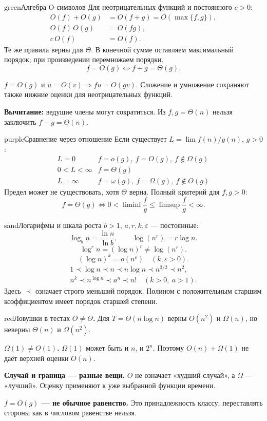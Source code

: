 \documentclass[a4paper,10pt]{article}
\newcommand{\key}[1]{\textbf{#1}}
\newlength{\colmax}
\newcounter{cheatcolnum}
\newenvironment{sheetcol}[1][.486\textwidth]{%
 \begin{lrbox}{\cheatcol}\begin{minipage}[t]{#1}\vspace{0pt}
}{%
 \end{minipage}\end{lrbox}\stepcounter{cheatcolnum}%
 \typeout{CHEAT-COLUMN-\thecheatcolnum: \the\dimexpr\ht\cheatcol+\dp\cheatcol\relax; LIMIT \the\colmax}%
 \ifdim\dimexpr\ht\cheatcol+\dp\cheatcol\relax>\colmax
 \PackageError{cheat}{Column \thecheatcolnum\space exceeds planned height}{Shorten content; keep body text at least 10pt.}\fi
 \usebox{\cheatcol}}
\begin{document}
\begin{sheetcol}
\begin{card}{green}{Алгебра O-символов\smash{\textsuperscript{*}}}
Для неотрицательных функций и постоянного $c>0$:
\[
\begin{aligned}
O(f)+O(g)&=O(f+g)=O(\max\{f,g\}),\\
O(f)\,O(g)&=O(fg),\\
c\,O(f)&=O(f).
\end{aligned}
\]
Те же правила верны для $\Theta$.
В конечной сумме оставляем максимальный порядок;
при произведении перемножаем порядки.
\[
f=O(g)\iff f+g=\Theta(g).
\]

$f=O(g)$ и $u=O(v)\Rightarrow fu=O(gv)$.
Сложение и умножение сохраняют также нижние оценки
для неотрицательных функций.

\key{Вычитание:} ведущие члены могут сократиться.
Из $f,g=\Theta(n)$ нельзя заключить
$f-g=\Theta(n)$.
\end{card}

\begin{card}{purple}{Сравнение через отношение}
Если существует $L=\lim f(n)/g(n)$, $g>0$:
\[
\begin{array}{c|l}
L=0 & f=o(g),\ f=O(g),\ f\notin\Omega(g)\\
0<L<\infty & f=\Theta(g)\\
L=\infty & f=\omega(g),\ f=\Omega(g),\ f\notin O(g)
\end{array}
\]
Предел может не существовать, хотя $\Theta$ верна.
Полный критерий для $f,g>0$:
\[
f=\Theta(g)\iff
0<\liminf\frac fg\le\limsup\frac fg<\infty.
\]
\end{card}

\begin{card}{sand}{Логарифмы и шкала роста\smash{\textsuperscript{*}}}
$b>1$, $a,r,k,\varepsilon$ --- постоянные:
\[
\log_b n=\frac{\ln n}{\ln b},\qquad
\log(n^r)=r\log n.
\]
\[
\log^r n=(\log n)^r\ne\log(n^r).
\]
\[
(\log n)^k=o(n^\varepsilon)\quad(k,\varepsilon>0).
\]
\[
\begin{gathered}
1\prec\log n\prec n\prec n\log n
\prec n^{3/2}\prec n^2,\\
n^k\prec n^{\log n}\prec a^n\prec n!
\quad(k>0,\ a>1).
\end{gathered}
\]
Здесь $\prec$ означает строго меньший порядок.
Полином с положительным старшим коэффициентом
имеет порядок старшей степени.
\end{card}

\begin{card}{red}{Ловушки в тестах\smash{\textsuperscript{*}}}
\key{$O\ne\Theta$.} Для $T=\Theta(n\log n)$ верны
$O(n^2)$ и $\Omega(n)$, но неверны $\Theta(n)$ и $\Omega(n^2)$.

\key{$\Omega(1)\ne O(1)$.}
$\Omega(1)$ может быть и $n$, и $2^n$.
Поэтому $O(n)+\Omega(1)$ не даёт верхней оценки $O(n)$.

\key{Случай и граница --- разные вещи.}
$O$ не означает «худший случай», а $\Omega$ --- «лучший».
Оценку применяют к уже выбранной функции времени.

\key{$f=O(g)$ --- не обычное равенство.}
Это принадлежность классу; переставлять стороны
как в числовом равенстве нельзя.
\end{card}
\end{sheetcol}
\end{document}
